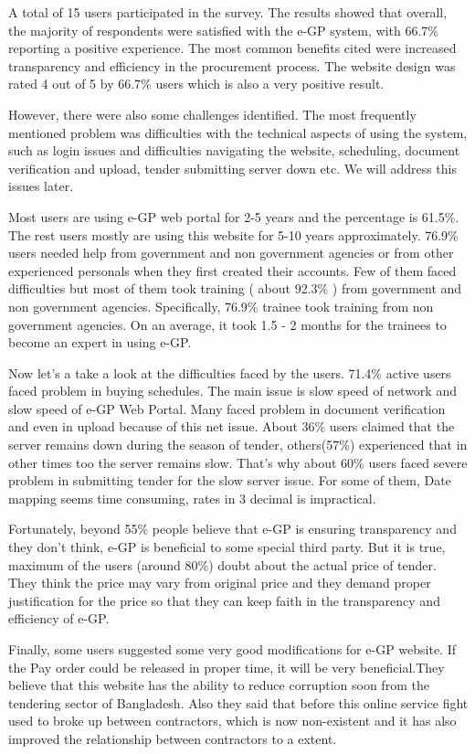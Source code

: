 \documentclass{report}
\begin{document}
A total of 15 users participated in the survey. The results showed that overall, the majority of respondents were satisfied with the e-GP system, with 66.7\% reporting a positive experience. The most common benefits cited were increased transparency and efficiency in the procurement process. The website design was rated 4 out of 5 by 66.7\% users which is also a very positive result.

However, there were also some challenges identified. The most frequently mentioned problem was difficulties with the technical aspects of using the system, such as login issues and difficulties navigating the website, scheduling, document verification and upload, tender submitting server down etc. We will address this issues later.

Most users are using e-GP web portal for 2-5 years and the percentage is 61.5\%.
The rest users mostly are using this website for 5-10 years approximately. 76.9\% users needed help from government and non government agencies or from other experienced personals when they first created their accounts. Few of them faced difficulties but most of them took training ( about 92.3\% ) from government and non government agencies. Specifically, 76.9\% trainee took training from non government agencies. On an average, it took 1.5 - 2 months for the trainees to become an expert in using e-GP.

Now let's a take a look at the difficulties faced by the users. 71.4\% active users faced problem in buying schedules. The main issue is slow speed of network and slow speed of e-GP Web Portal. Many faced problem in document verification and even in upload because of this net issue. About 36\% users claimed that the server remains down during the season of tender, others(57\%) experienced that in other times too the server remains slow. That's why about 60\% users faced severe problem in submitting tender for the slow server issue. For some of them, Date mapping seems time consuming, rates in 3 decimal is impractical.

Fortunately, beyond 55\% people believe that e-GP is ensuring transparency and they don't think, e-GP is beneficial to some special third party. But it is true, maximum of the users (around 80\%) doubt about the actual price of tender. They think the price may vary from original price and they demand proper justification for the price so that they can keep faith in the transparency and efficiency of e-GP.

Finally, some users suggested some very good modifications for e-GP website. If the Pay order could be released in proper time, it will be very beneficial.They believe that this website has the ability to reduce corruption soon from the tendering sector of Bangladesh. Also they said that before this online service fight used to broke up between contractors, which is now non-existent and it has also improved the relationship between contractors to a extent.
\end{document}
